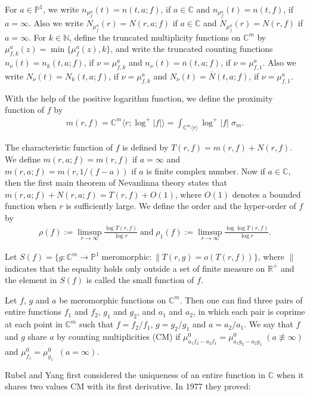 \documentclass[11pt, reqno]{amsart}
\newcommand{\ol}{\overline}
\numberwithin{equation}{section}
\begin{document}
For $a\in\mathbb{P}^1$, we write $n_{\mu_f^a}(t)=n(t,a;f)$, if $a\in\mathbb{C}$ and $n_{\mu_f^a}(t)=n(t,f)$, if $a=\infty$. Also we write $N_{\mu_f^a}(r)=N(r,a;f)$ if $a\in\mathbb{C}$ and $N_{\mu_f^a}(r)=N(r,f)$ if $a=\infty$.
For $k\in\mathbb{N}$, define the truncated multiplicity functions on $\mathbb{C}^m$ by $\mu_{f,k}^a(z)=\min\{\mu_f^a(z),k\}$,
and write the truncated counting functions $n_{\nu}(t)=n_k(t,a;f)$, if $\nu=\mu_{f,k}^a$ and $n_{\nu}(t)=\ol{n}(t,a;f)$, if $\nu=\mu_{f,1}^a$. Also we write
 $N_{\nu}(t)=N_k(t,a;f)$, if $\nu=\mu_{f,k}^a$ and $N_{\nu}(t)=\ol{N}(t,a;f)$, if $\nu=\mu_{f,1}^a$.

\medskip
With the help of the positive logarithm function, we define the proximity function of $f$ by
\begin{align*}
m(r, f)=\mathbb{C}^m\langle r; \log^+ | f | \rangle=\int_{\mathbb{C}^m\langle r\rangle} \log^+ |f|\;\sigma_m.
\end{align*}

The characteristic function of $f$ is defined by $T(r, f)=m(r,f)+N(r,f)$. We define $m(r,a;f)=m(r,f)$ if $a=\infty$ and $m(r,a;f)=m(r,1/(f-a))$ if $a$ is finite complex number. Now if $a\in\mathbb{C}$, then the first main theorem of Nevanlinna theory states that $m(r,a;f)+N(r,a;f)=T(r,f)+O(1)$, where $O(1)$ denotes a bounded function when $r$ is sufficiently large. We define the order and the hyper-order of $f$ by
\begin{align*}
\rho(f):=\limsup_{r \rightarrow \infty} \frac{\log T(r, f)}{\log r}\;\text{and}\;\rho_1(f):=\limsup_{r \rightarrow \infty} \frac{\log \log T(r, f)}{\log r}.
\end{align*}

Let $S(f)=\{g:\mathbb{C}^m\to\mathbb{P}^1\;\text{meromorphic}:\parallel T(r,g)=o(T(r,f))\}$, where $\parallel$ indicates that the equality holds only outside a set of finite measure on $\mathbb{R}^+$ and the element in $S(f)$ is called the small function of $f$.

Let $f$, $g$ and $a$ be meromorphic functions on $\mathbb{C}^m$. Then one can find three pairs
of entire functions $f_1$ and $f_2$, $g_1$ and $g_2$, and $a_1$ and $a_2$, in which each pair is coprime
at each point in $\mathbb{C}^m$ such that $f = f_2/f_1$, $g=g_2/g_1$ and $a = a_2/a_1$.
We say that $f$ and $g$ share $a$ by counting multiplicities (CM) if $\mu_{a_1f_2-a_2f_1}^0=\mu_{a_1g_2-a_2g_1}^0\;(a\not\equiv \infty)$ and $\mu_{f_1}^0=\mu_{g_1}^0\;\;(a=\infty)$. 

\medskip
Rubel and Yang \cite{Rubel-Yang} first considered the uniqueness of an entire function in $\mathbb{C}$ when it shares two values CM with its first derivative. In 1977 they proved:
\end{document}

